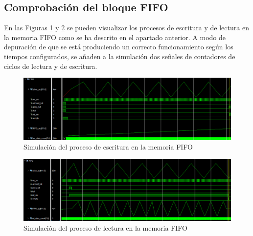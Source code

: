 \pagebreak

\subsection{Comprobación del bloque FIFO}

En las Figuras \ref{fig:fifo_wr} y \ref{fig:fifo_rd} se pueden visualizar los procesos de escritura y de lectura en la memoria FIFO como se ha descrito en el apartado anterior. A modo de depuración de que se está produciendo un correcto funcionamiento según los tiempos configurados, se añaden a la simulación dos señales de contadores de ciclos de lectura y de escritura.

\vspace{3mm}

\begin{figure}[h]
    \centering
    \includegraphics[width=1\textwidth]{img/simu/fifo_wr.PNG}
    \caption{Simulación del proceso de escritura en la memoria FIFO}
    \label{fig:fifo_wr}
\end{figure}
    
\vspace{3mm}

\begin{figure}[h]
    \centering
    \includegraphics[width=1\textwidth]{img/simu/fifo_rd.PNG}
    \caption{Simulación del proceso de lectura en la memoria FIFO}
    \label{fig:fifo_rd}
\end{figure}
    
\vspace{3mm}

      
